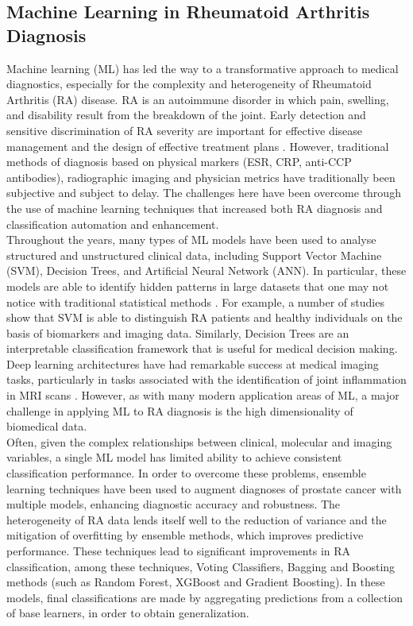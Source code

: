 \documentclass[10pt]{NSP1}
\begin{document}
	\subsection{Machine Learning in Rheumatoid Arthritis Diagnosis}
	Machine learning (ML) has led the way to a transformative approach to medical diagnostics, especially for the complexity and heterogeneity of Rheumatoid Arthritis (RA) disease. RA is an autoimmune disorder in which pain, swelling, and disability result from the breakdown of the joint. Early detection and sensitive discrimination of RA severity are important for effective disease management and the design of effective treatment plans \cite{ren2023deepmpf}. However, traditional methods of diagnosis based on physical markers (ESR, CRP, anti-CCP antibodies), radiographic imaging and physician metrics have traditionally been subjective and subject to delay. The challenges here have been overcome through the use of machine learning techniques that increased both RA diagnosis and classification automation and enhancement.\\
	Throughout the years, many types of ML models have been used to analyse structured and unstructured clinical data, including Support Vector Machine (SVM), Decision Trees, and Artificial Neural Network (ANN). In particular, these models are able to identify hidden patterns in large datasets that one may not notice with traditional statistical methods \cite{ren2023deepmpf}. For example, a number of studies show that SVM is able to distinguish RA patients and healthy individuals on the basis of biomarkers and imaging data. Similarly, Decision Trees are an interpretable classification framework that is useful for medical decision making. Deep learning architectures have had remarkable success at medical imaging tasks, particularly in tasks associated with the identification of joint inflammation in MRI scans \cite{jana2023hybrid}. However, as with many modern application areas of ML, a major challenge in applying ML to RA diagnosis is the high dimensionality of biomedical data.\\
	Often, given the complex relationships between clinical, molecular and imaging variables, a single ML model has limited ability to achieve consistent classification performance. In order to overcome these problems, ensemble learning techniques have been used to augment diagnoses of prostate cancer with multiple models, enhancing diagnostic accuracy and robustness. The heterogeneity of RA data lends itself well to the reduction of variance and the mitigation of overfitting by ensemble methods, which improves predictive performance. These techniques lead to significant improvements in RA classification, among these techniques, Voting Classifiers, Bagging and Boosting methods (such as Random Forest, XGBoost and Gradient Boosting). In these models, final classifications are made by aggregating predictions from a collection of base learners, in order to obtain generalization.\\
\end{document}
